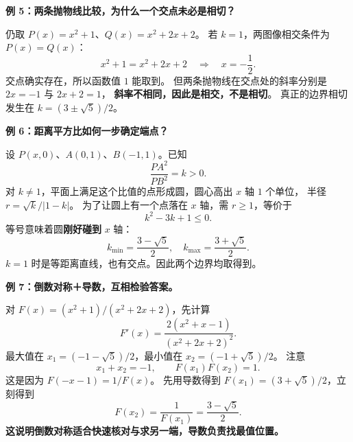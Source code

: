 \clearpage
\begin{examplebox}
\textbf{\textcolor{CExample}{例 5：两条抛物线比较，为什么一个交点未必是相切？}}

仍取 $P(x)=x^2+1$、$Q(x)=x^2+2x+2$。
若 $k=1$，两图像相交条件为 $P(x)=Q(x)$：
\[
 x^2+1=x^2+2x+2\quad\Longrightarrow\quad x=-\frac12.
\]
交点确实存在，所以函数值 $1$ 能取到。
但两条抛物线在交点处的斜率分别是 $2x=-1$ 与 $2x+2=1$，
\textbf{斜率不相同，因此是相交，不是相切}。
真正的边界相切发生在 $k=(3\pm\sqrt5)/2$。
\end{examplebox}

\clearpage
\begin{examplebox}
\textbf{\textcolor{CExample}{例 6：距离平方比如何一步确定端点？}}
\begin{center}\end{center}
设 $P(x,0)$、$A(0,1)$、$B(-1,1)$。已知
\[
 \frac{PA^2}{PB^2}=k>0.
\]
对 $k\ne1$，平面上满足这个比值的点形成圆，圆心高出 $x$ 轴 $1$ 个单位，
半径 $r=\sqrt{k}/|1-k|$。
为了让圆上有一个点落在 $x$ 轴，需 $r\ge1$，等价于
\[
  k^2-3k+1\le0.
\]
等号意味着圆\textbf{刚好碰到} $x$ 轴：
\[
 k_{\min}=\frac{3-\sqrt5}{2},\quad
 k_{\max}=\frac{3+\sqrt5}{2}.
\]
$k=1$ 时是等距离直线，也有交点。因此两个边界均取得到。
\end{examplebox}

\clearpage
\begin{examplebox}
\textbf{\textcolor{CExample}{例 7：倒数对称＋导数，互相检验答案。}}

对 $F(x)=(x^2+1)/(x^2+2x+2)$，先计算
\[
 F'(x)=\frac{2(x^2+x-1)}{(x^2+2x+2)^2}.
\]
最大值在 $x_1=(-1-\sqrt5)/2$，最小值在 $x_2=(-1+\sqrt5)/2$。
注意
\[
 x_1+x_2=-1,\qquad F(x_1)F(x_2)=1.
\]
这是因为 $F(-x-1)=1/F(x)$。
先用导数得到 $F(x_1)=(3+\sqrt5)/2$，立刻得到
\[
 F(x_2)=\frac1{F(x_1)}=\frac{3-\sqrt5}{2}.
\]
\textbf{这说明倒数对称适合快速核对与求另一端，导数负责找最值位置。}
\end{examplebox}
